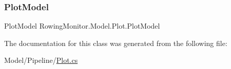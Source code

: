 \subsubsection{\texorpdfstring{Plot\+Model}{PlotModel}}
{\footnotesize\ttfamily Plot\+Model Rowing\+Monitor.\+Model.\+Plot.\+Plot\+Model\hspace{0.3cm}{\ttfamily [get]}}



The documentation for this class was generated from the following file\+:\begin{DoxyCompactItemize}
\item 
Model/\+Pipeline/\hyperlink{_plot_8cs}{Plot.\+cs}\end{DoxyCompactItemize}
